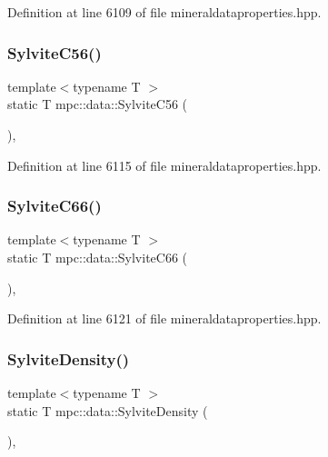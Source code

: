 Definition at line 6109 of file mineraldataproperties.\+hpp.

\mbox{\label{namespacempc_1_1data_a611647f3789205e29c25bd049fe00e90}} 
\subsubsection{\texorpdfstring{Sylvite\+C56()}{SylviteC56()}}
{\footnotesize\ttfamily template$<$typename T $>$ \\
static T mpc\+::data\+::\+Sylvite\+C56 (\begin{DoxyParamCaption}{ }\end{DoxyParamCaption})\hspace{0.3cm}{\ttfamily [inline]}, {\ttfamily [static]}}



Definition at line 6115 of file mineraldataproperties.\+hpp.

\mbox{\label{namespacempc_1_1data_aaa2ddbe02c171ac56104d8f2ee4b522d}} 
\subsubsection{\texorpdfstring{Sylvite\+C66()}{SylviteC66()}}
{\footnotesize\ttfamily template$<$typename T $>$ \\
static T mpc\+::data\+::\+Sylvite\+C66 (\begin{DoxyParamCaption}{ }\end{DoxyParamCaption})\hspace{0.3cm}{\ttfamily [inline]}, {\ttfamily [static]}}



Definition at line 6121 of file mineraldataproperties.\+hpp.

\mbox{\label{namespacempc_1_1data_a93d6b463cae170d0b581901e90f8b63b}} 
\subsubsection{\texorpdfstring{Sylvite\+Density()}{SylviteDensity()}}
{\footnotesize\ttfamily template$<$typename T $>$ \\
static T mpc\+::data\+::\+Sylvite\+Density (\begin{DoxyParamCaption}{ }\end{DoxyParamCaption})\hspace{0.3cm}{\ttfamily [inline]}, {\ttfamily [static]}}




